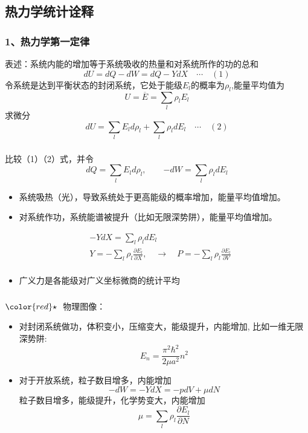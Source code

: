 \subsection{热力学统计诠释}

\begin{frame}
  \frametitle{ 1、热力学第一定律}
  表述：系统内能的增加等于系统吸收的热量和对系统所作的功的总和 
\[ dU = dQ - dW = dQ- Y dX \quad \cdots \quad (1) \]
令系统是达到平衡状态的封闭系统，它处于能级$E_l$的概率为$\rho _l$,能量平均值为
\[ U = \overline{E} = \sum_l \rho _l E_l\]
求微分
\[ dU = \sum_l E_l d\rho _l + \sum_l \rho _l d E_l \quad \cdots \quad (2)\]
\end{frame} 

\begin{frame}
  \frametitle{}
比较（1）（2）式，并令  
\[\boxed{ dQ = \sum_l E_l d\rho _l} , \qquad  \boxed{-dW = \sum_l \rho _l d E_l}  \]
\emf[统计诠释:] 
\begin{itemize}
  \item 系统吸热（光），导致系统处于更高能级的概率增加，能量平均值增加。
  \item 对系统作功，系统能谱被提升（比如无限深势阱），能量平均值增加。
\end{itemize}
\[
\begin{aligned}
  &-Y dX = \sum_l \rho _l d E_l  \\
  & \boxed{Y = - \sum_l \rho _l \frac{\partial E_l }{\partial X}} , \quad \to \quad P = - \sum_l \rho _l \frac{\partial E_l }{\partial V} \\ 
\end{aligned}\]
\begin{itemize}
  \item 广义力是各能级对广义坐标微商的统计平均
\end{itemize}
\end{frame} 


\begin{frame}[label=current]
  \frametitle{}
${\color{red}\star}~$ 物理图像：
\begin{itemize}
  \item 对封闭系统做功，体积变小，压缩变大，能级提升，内能增加, 比如一维无限深势阱:
  \[E_{n} = \dfrac{\pi^2\hbar^2}{2\mu a^2 } n^2  \]
  \item 对于开放系统，粒子数目增多，内能增加
  \begin{equation*}
    - dW = - Y dX = -p d V + \mu d N
    \end{equation*}
  粒子数目增多，能级提升，化学势变大，内能增加
  \[\mu = \sum_l \rho _l \frac{\partial E_l }{\partial N } \]
\end{itemize}
\end{frame} 


